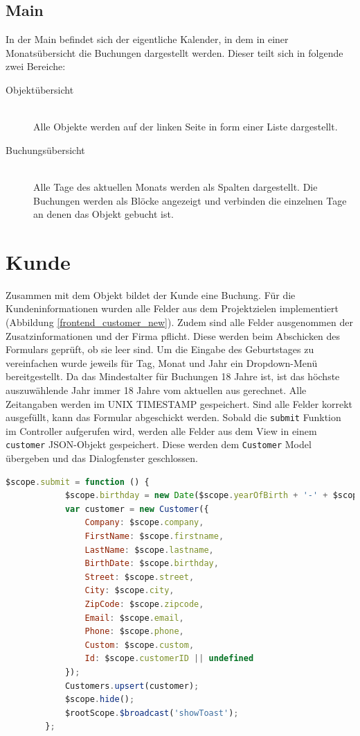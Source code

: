 \subsection{Main}
In der Main befindet sich der eigentliche Kalender, in dem in einer Monatsübersicht die Buchungen dargestellt werden. 
Dieser teilt sich in folgende zwei Bereiche:
\begin{description}
\item[Objektübersicht]\hfill \\
Alle Objekte werden auf der linken Seite in form einer Liste dargestellt.
\item[Buchungsübersicht]\hfill \\ 
Alle Tage des aktuellen Monats werden als Spalten dargestellt. Die Buchungen werden als Blöcke angezeigt und verbinden die einzelnen Tage an denen das Objekt gebucht ist.  
\end{description}

\section{Kunde}
Zusammen mit dem Objekt bildet der Kunde eine Buchung. Für die Kundeninformationen wurden alle Felder aus dem Projektzielen implementiert (Abbildung \ref{frontend_customer_new}). Zudem sind alle Felder ausgenommen der Zusatzinformationen und der Firma pflicht. Diese werden beim Abschicken des Formulars geprüft, ob sie leer sind. Um die Eingabe des Geburtstages zu vereinfachen wurde jeweils für Tag, Monat und Jahr ein Dropdown-Menü bereitgestellt. Da das Mindestalter für Buchungen 18 Jahre ist, ist das höchste auszuwählende Jahr immer 18 Jahre vom aktuellen aus gerechnet. Alle Zeitangaben werden im UNIX TIMESTAMP gespeichert. Sind alle Felder korrekt ausgefüllt, kann das Formular abgeschickt werden. Sobald die \texttt{submit} Funktion im Controller aufgerufen wird, werden alle Felder aus dem View in einem \texttt{customer} JSON-Objekt gespeichert. Diese werden dem \texttt{Customer} Model übergeben und das Dialogfenster geschlossen.

\begin{lstlisting}[language=JavaScript, label=code_exampleRegistrationRequest, caption=submit Methode im customer Controller]
		$scope.submit = function () {
            $scope.birthday = new Date($scope.yearOfBirth + '-' + $scope.monthOfBirth + '-' + $scope.dayOfBirth).getTime();
            var customer = new Customer({
                Company: $scope.company,
                FirstName: $scope.firstname,
                LastName: $scope.lastname,
                BirthDate: $scope.birthday,
                Street: $scope.street,
                City: $scope.city,
                ZipCode: $scope.zipcode,
                Email: $scope.email,
                Phone: $scope.phone,
                Custom: $scope.custom,
                Id: $scope.customerID || undefined
            });
            Customers.upsert(customer);
            $scope.hide();
            $rootScope.$broadcast('showToast');
        };
\end{lstlisting}

